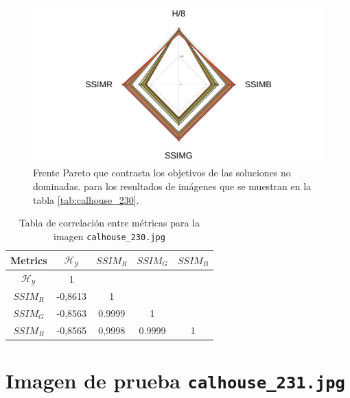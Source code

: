     \begin{figure}[H]
    \centering
    \includegraphics[width=\textwidth]{./Figures/calhouse_230/calhouse_230_2.jpg}
    \caption{Frente Pareto que contrasta los objetivos de las soluciones no dominadas. para los resultados de imágenes que se muestran en la tabla \ref{tab:calhouse_230}.}
    \label{fig:calhouse2302fp}
    \end{figure}

\begin{table}[H]
\setlength{\abovecaptionskip}{2pt plus 3pt minus 2pt} %
\caption[Parámetros de entrada para $MOPSO$]{Tabla de correlación entre métricas para la imagen \texttt{calhouse\_230.jpg}}
\begin{center}
 \begin{tabular}{||c | c c c c||} 
 \hline
Metrics & $\mathscr{H_Y}$ & $SSIM_R$ & $SSIM_G$ & $SSIM_B$ \\ 
\hline
$\mathscr{H_Y}$ & 1 &  &  & \\ 
\hline
$SSIM_R$ & -0,8613 & 1 &  \\ 
\hline
$SSIM_G$ & -0,8563 & 0.9999  & 1  & \\ 
\hline
$SSIM_B$ & -0,8565 & 0,9998  & 0.9999  & 1 \\ 
\hline
\end{tabular}
\end{center}
\label{table:correlacion}
\end{table}

\section{Imagen de prueba \texttt{calhouse\_231.jpg}}

